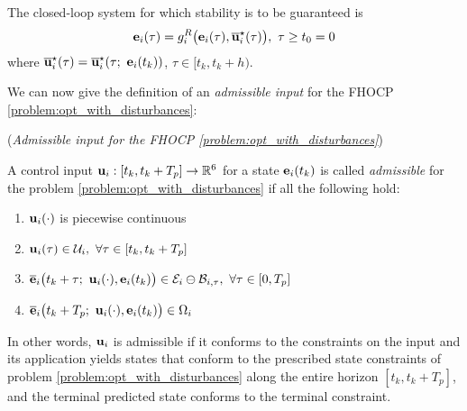 The closed-loop system for which stability is to be guaranteed is
\begin{align}
  \bm{\mathbf{e}}_i(\tau) = g_i^R\big(\bm{\mathbf{e}}_i(\tau), \overline{\bm{\mathbf{u}}}_i^{\star}(\tau)\big),\ \tau \geq t_0 = 0
  \label{eq:with_disturbances_closed_loop}
\end{align}
where $\overline{\bm{\mathbf{u}}}_i^{\star}(\tau) = \overline{\bm{\mathbf{u}}}_i^{\star}(\tau;\ \bm{\mathbf{e}}_i(t_k))$,
$\tau \in [t_k, t_k + h)$.

We can now give the definition of an \textit{admissible input} for the FHOCP
\eqref{problem:opt_with_disturbances}:\\[1ex]

\begin{bw_box}
  \begin{definition} (\textit{Admissible input for the FHOCP
    \eqref{problem:opt_with_disturbances}})
  \label{definition:admissible_input_with_disturbance}

  A control input $\bm{\mathbf{u}}_i : [t_k, t_k + T_p] \to \mathbb{R}^6$ for a state
  $\bm{\mathbf{e}}_i(t_k)$ is called \textit{admissible} for the problem
  \eqref{problem:opt_with_disturbances} if all the following hold:

  \begin{enumerate}
    \item $\bm{\mathbf{u}}_i(\cdot)$ is piecewise continuous
    \item $\vect{u}_i(\tau) \in \mathcal{U}_i,\ \forall \tau \in [t_k, t_k + T_p]$
    \item $\overline{\vect{e}}_i\big(t_k + \tau;\ \vect{u}_i(\cdot), \vect{e}_i(t_k)\big) \in \mathcal{E}_i \ominus \mathcal{B}_{i,\tau},\ \forall \tau \in [0, T_p]$
    \item $\overline{\vect{e}}_i\big(t_k + T_p;\ \vect{u}_i(\cdot), \vect{e}_i(t_k)\big) \in \Omega_i$
  \end{enumerate}

  In other words, $\bm{\mathbf{u}}_i$ is admissible if it conforms to the constraints
  on the input and its application yields states that conform to the
  prescribed state constraints of problem \eqref{problem:opt_with_disturbances}
  along the entire horizon $[t_k, t_k + T_p]$, and the terminal predicted
  state conforms to the terminal constraint.

\end{definition}
\end{bw_box}
